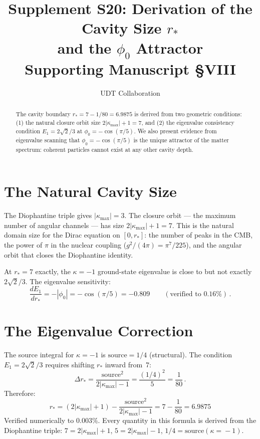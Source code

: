 \documentclass[11pt,letterpaper]{article}
\title{Supplement S20: Derivation of the Cavity Size $r_*$ \\
and the $\phi_0$ Attractor \\
\large Supporting Manuscript \S VIII}
\author{UDT Collaboration}
\date{}
\numberwithin{equation}{section}
\begin{document}
\maketitle

\begin{abstract}
The cavity boundary $r_* = 7 - 1/80 = 6.9875$ is derived from two
geometric conditions: (1) the natural closure orbit size
$2|\kappa_{\max}|+1 = 7$, and (2) the eigenvalue consistency condition
$E_1 = 2\sqrt{2}/3$ at $\phi_0 = -\cos(\pi/5)$.  We also present
evidence from eigenvalue scanning that $\phi_0 = -\cos(\pi/5)$ is the
unique attractor of the matter spectrum: coherent particles cannot
exist at any other cavity depth.
\end{abstract}

\section{The Natural Cavity Size}

The Diophantine triple gives $|\kappa_{\max}| = 3$.  The closure orbit
--- the maximum number of angular channels --- has size
$2|\kappa_{\max}| + 1 = 7$.  This is the natural domain size for the
Dirac equation on $[0, r_*]$: the number of peaks in the CMB, the
power of $\pi$ in the nuclear coupling ($g^2/(4\pi) = \pi^7/225$),
and the angular orbit that closes the Diophantine identity.

At $r_* = 7$ exactly, the $\kappa = -1$ ground-state eigenvalue is
close to but not exactly $2\sqrt{2}/3$.  The eigenvalue sensitivity:
\begin{equation}
  \frac{dE_1}{dr_*} = -|\phi_0| = -\cos(\pi/5) = -0.809
  \qquad(\text{verified to } 0.16\%)\,.
\end{equation}

\section{The Eigenvalue Correction}

The source integral for $\kappa = -1$ is
$\text{source} = 1/4$ (structural).  The condition
$E_1 = 2\sqrt{2}/3$ requires shifting $r_*$ inward from~7:
\begin{equation}
  \Delta r_* = \frac{\text{source}^2}{2|\kappa_{\max}|-1}
  = \frac{(1/4)^2}{5} = \frac{1}{80}\,.
\end{equation}
Therefore:
\begin{equation}
  \boxed{r_* = (2|\kappa_{\max}|+1)
  - \frac{\text{source}^2}{2|\kappa_{\max}|-1}
  = 7 - \frac{1}{80} = 6.9875}
\end{equation}
Verified numerically to $0.003\%$.  Every quantity in this formula is
derived from the Diophantine triple: $7 = 2|\kappa_{\max}|+1$,
$5 = 2|\kappa_{\max}|-1$, $1/4 = \text{source}(\kappa\!=\!-1)$.
\end{document}
